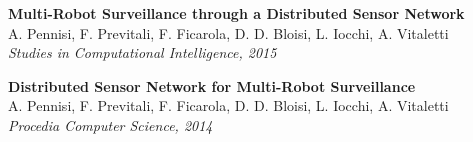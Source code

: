 \begin{frame}
	\tiny
	
	\textbf{Multi-Robot Surveillance through a Distributed Sensor Network} \\
	A. Pennisi, F. Previtali, F. Ficarola, D. D. Bloisi, L. Iocchi, A. Vitaletti \\
	\emph{Studies in Computational Intelligence, 2015} \\
	
	\vspace{0.1cm}
	
	\textbf{Distributed Sensor Network for Multi-Robot Surveillance} \\
	A. Pennisi, F. Previtali, F. Ficarola, D. D. Bloisi, L. Iocchi, A. Vitaletti \\
	\emph{Procedia Computer Science, 2014} \\
\end{frame}
